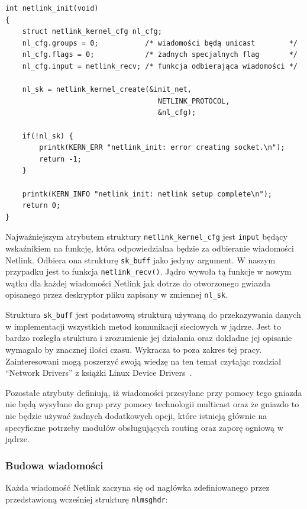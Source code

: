 \documentclass[11pt]{scrartcl}
\begin{document}
\begin{verbatim}
int netlink_init(void)
{
    struct netlink_kernel_cfg nl_cfg;
    nl_cfg.groups = 0;           /* wiadomości będą unicast        */
    nl_cfg.flags = 0;            /* żadnych specjalnych flag       */
    nl_cfg.input = netlink_recv; /* funkcja odbierająca wiadomości */

    nl_sk = netlink_kernel_create(&init_net,
                                    NETLINK_PROTOCOL,
                                    &nl_cfg);

    if(!nl_sk) {
        printk(KERN_ERR "netlink_init: error creating socket.\n");
        return -1;
    }

    printk(KERN_INFO "netlink_init: netlink setup complete\n");
    return 0;
}
\end{verbatim}

Najważniejszym atrybutem struktury \texttt{netlink\_kernel\_cfg} jest \texttt{input} będący wskaźnikiem na funkcję, która odpowiedzialna będzie za odbieranie wiadomości Netlink. Odbiera ona strukturę \texttt{sk\_buff} jako jedyny argument. W naszym przypadku jest to funkcja \texttt{netlink\_recv()}. Jądro wywoła tą funkcje w nowym wątku dla każdej wiadomości Netlink jak dotrze do otworzonego gwiazda opisanego przez deskryptor pliku zapisany w zmiennej \texttt{nl\_sk}.

Struktura \texttt{sk\_buff} jest podstawową strukturą używaną do przekazywania danych w implementacji wszystkich metod komunikacji sieciowych w jądrze. Jest to bardzo rozległa struktura i zrozumienie jej działania oraz dokładne jej opisanie wymagało by znacznej ilości czasu.  Wykracza to poza zakres tej pracy. Zainteresowani mogą poszerzyć swoją wiedzę na ten temat czytając rozdział ``Network Drivers'' z książki Linux Device Drivers~\cite{ldd}.

Pozostałe atrybuty definiują, iż wiadomości przesyłane przy pomocy tego gniazda nie będą wysyłane do grup przy pomocy technologii multicast oraz że gniazdo to nie będzie używać żadnych dodatkowych opcji, które istnieją głównie na specyficzne potrzeby modułów obsługujących routing oraz zaporę ogniową w jądrze.

\subsubsection{Budowa wiadomości}
\label{msgbuild}

Każda wiadomość Netlink zaczyna się od nagłówka zdefiniowanego przez przedstawioną wcześniej strukturę \texttt{nlmsghdr}:
\end{document}
